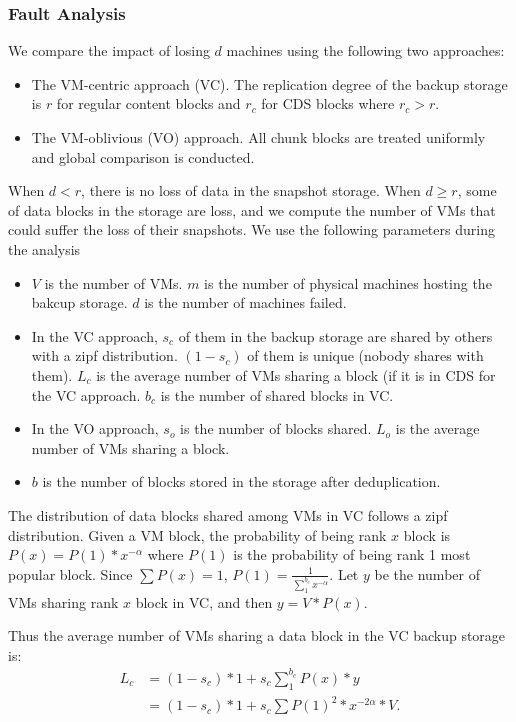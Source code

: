 \subsubsection{Fault Analysis }

We  compare the impact of losing $d$ machines using the following two approaches:
\begin{itemize}
\item The VM-centric approach (VC).  The replication degree of the backup storage 
is $r$ for regular content blocks and $r_c$ for CDS blocks where $r_c>r$. 
\item The VM-oblivious (VO) approach.
All chunk  blocks are treated uniformly and global comparison is conducted.
\end{itemize} 
 
When $d<r$, there is no loss of data in the snapshot storage.
When $d \ge r$, some of data blocks in the storage are loss, and we compute the number of VMs that could
suffer the loss of their snapshots.
We use the following parameters  during the analysis
\begin{itemize}
\item 	$V$ is the number of VMs. $m$ is the number of physical machines hosting the bakcup storage.
$d$ is the number of machines failed.
\item In the VC approach, $s_c$  of them in the backup storage
are shared by others with a zipf distribution. $(1-s_c)$ 
of them  is unique (nobody shares with them).
$L_c$ is the average number of VMs sharing a block (if it is in CDS for the VC approach.
$b_c$ is the number of shared blocks in VC.
\item In the VO approach, $s_o$ is the number of blocks shared.
$L_o$ is the average number of VMs sharing a block. 
\item $b$ is the  number of blocks stored in the storage after deduplication.
 \end{itemize}

The distribution of data blocks shared among VMs in VC follows a zipf distribution.
Given a VM block, the probability of being rank $x$ block is $P(x) = P(1) * x^{-\alpha}$
where $P(1)$ is the probability of being rank 1 most popular block.
Since $\sum P(x)= 1$, $P(1)= \frac{1}{\sum_1^{b_c} x^{-\alpha} }$.
Let $y$ be the number of VMs sharing rank $x$ block in VC, and  then  $y= V* P(x)$.

Thus the average number of VMs sharing a data block in the VC backup storage is:
\begin{equation}
\begin{split}
L_c& =  (1-s_c)*1 + s_c \sum_1^{b_c} P(x) * y \\
& =  (1-s_c)*1 + s_c \sum P(1)^2 *  x^{-2\alpha} *  V.
\end{split}
\end{equation}

